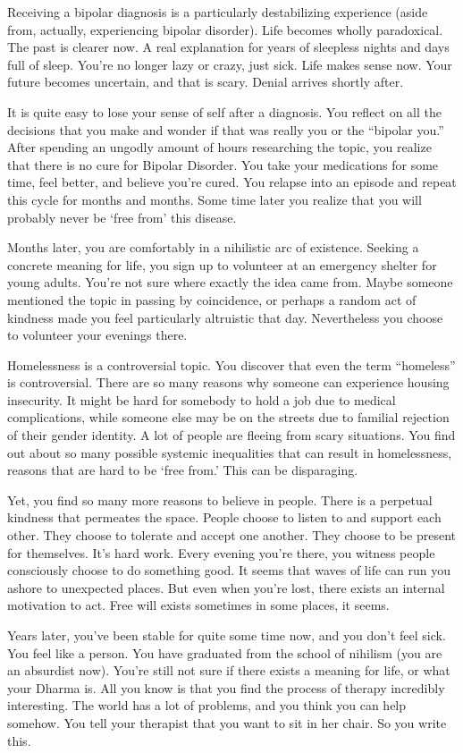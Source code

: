 \documentclass[12pt,letterpaper]{article}
\begin{document}
Receiving a bipolar diagnosis is a particularly destabilizing experience (aside from, actually, experiencing bipolar disorder). Life becomes wholly paradoxical. The past is clearer now. A real explanation for years of sleepless nights and days full of sleep. You’re no longer lazy or crazy, just sick. Life makes sense now. Your future becomes uncertain, and that is scary. Denial arrives shortly after.

It is quite easy to lose your sense of self after a diagnosis. You reflect on all the decisions that you make and wonder if that was really you or the “bipolar you.” After spending an ungodly amount of hours researching the topic, you realize that there is no cure for Bipolar Disorder. You take your medications for some time, feel better, and believe you’re cured. You relapse into an episode and repeat this cycle for months and months. Some time later you realize that you will probably never be ‘free from’ this disease.

Months later, you are comfortably in a nihilistic arc of existence. Seeking a concrete meaning for life, you sign up to volunteer at an emergency shelter for young adults. You’re not sure where exactly the idea came from. Maybe someone mentioned the topic in passing by coincidence, or perhaps a random act of kindness made you feel particularly altruistic that day. Nevertheless you choose to volunteer your evenings there.

Homelessness is a controversial topic. You discover that even the term “homeless” is controversial. There are so many reasons why someone can experience housing insecurity. It might be hard for somebody to hold a job due to medical complications, while someone else may be on the streets due to familial rejection of their gender identity. A lot of people are fleeing from scary situations. You find out about so many possible systemic inequalities that can result in homelessness, reasons that are hard to be ‘free from.’ This can be disparaging.

Yet, you find so many more reasons to believe in people. There is a perpetual kindness that permeates the space. People choose to listen to and support each other. They choose to tolerate and accept one another. They choose to be present for themselves. It’s hard work. Every evening you’re there, you witness people consciously choose to do something good. It seems that waves of life can run you ashore to unexpected places. But even when you’re lost, there exists an internal motivation to act. Free will exists sometimes in some places, it seems.

Years later, you’ve been stable for quite some time now, and you don’t feel sick. You feel like a person. You have graduated from the school of nihilism (you are an absurdist now). You’re still not sure if there exists a meaning for life, or what your Dharma is. All you know is that you find the process of therapy incredibly interesting. The world has a lot of problems, and you think you can help somehow. You tell your therapist that you want to sit in her chair. So you write this.
\end{document}
